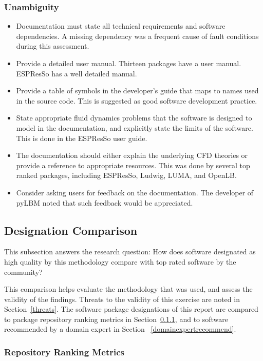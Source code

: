 \documentclass[final, 3p, times, authoryear]{elsarticle}
\begin{document}
\subsubsection{Unambiguity}

\begin{itemize}
	\item Documentation must state all technical requirements and software
	dependencies. A missing dependency was a frequent cause of fault conditions
	during this assessment.
	\item Provide a detailed user manual. Thirteen packages have a user manual.
	ESPResSo has a well detailed manual.
	\item Provide a table of symbols in the developer's guide that maps to names
	used in the source code. This is suggested as good software development
	practice.
	\item State appropriate fluid dynamics problems that the software is
	designed to model in the documentation, and explicitly state the limits of
	the software. This is done in the ESPResSo user guide.
	\item The documentation should either explain the underlying CFD theories or
	provide a reference to appropriate resources. This was done by several top
	ranked packages, including ESPResSo, Ludwig, LUMA, and OpenLB.
	\item Consider asking users for feedback on the documentation. The developer
	of pyLBM noted that such feedback would be appreciated.
\end{itemize}

\subsection{Designation Comparison} \label{comparison}

This subsection answers the research question: How does software designated as
high quality by this methodology compare with top rated software by the
community?

This comparison helps evaluate the methodology that was used, and assess the
validity of the findings. Threats to the validity of this exercise are noted in
Section~\ref{threats}. The software package designations of this report are
compared to package repository ranking metrics in Section~\ref{repmetrics}, and
to software recommended by a domain expert in Section
~\ref{domainexpertrecommend}.

\subsubsection{Repository Ranking Metrics} \label{repmetrics}
\end{document}
